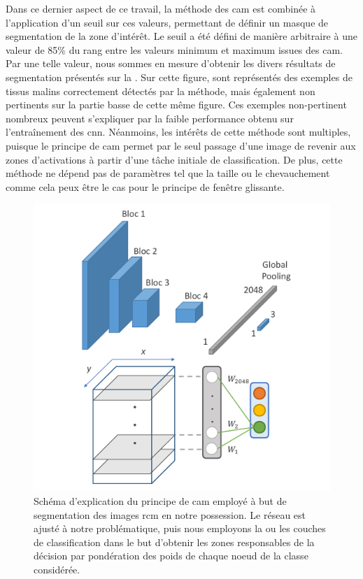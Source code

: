 Dans ce dernier aspect de ce travail, la méthode des \gls{cam} est combinée à l'application d'un seuil sur ces valeurs, permettant de définir un masque de segmentation de la zone d'intérêt. Le seuil a été défini de manière arbitraire à une valeur de 85\% du rang entre les valeurs minimum et maximum issues des \gls{cam}. Par une telle valeur, nous sommes en mesure d'obtenir les divers résultats de segmentation présentés sur la . Sur cette figure, sont représentés des exemples de tissus malins correctement détectés par la méthode, mais également non pertinents sur la partie basse de cette même figure. Ces exemples non-pertinent nombreux peuvent s'expliquer par la faible performance obtenu sur l'entraînement des \gls{cnn}. Néanmoins, les intérêts de cette méthode sont multiples, puisque le principe de \gls{cam} permet par le seul passage d'une image de revenir aux zones d'activations à partir d'une tâche initiale de classification. De plus, cette méthode ne dépend pas de paramètres tel que la taille ou le chevauchement comme cela peux être le cas pour le principe de fenêtre glissante.\par

\begin{figure}[H]
    \centering
    \includegraphics[width=\linewidth]{contents/chapter_6/resources/scheme_image_improvement_cam.pdf}
    \caption{Schéma d'explication du principe de \gls{cam} employé à but de segmentation des images \gls{rcm} en notre possession. Le réseau est ajusté à notre problématique, puis nous employons la ou les couches de classification dans le but d'obtenir les zones responsables de la décision par pondération des poids de chaque noeud de la classe considérée.}
    \label{fig:scheme_image_improvement_cam}
\end{figure}\par

